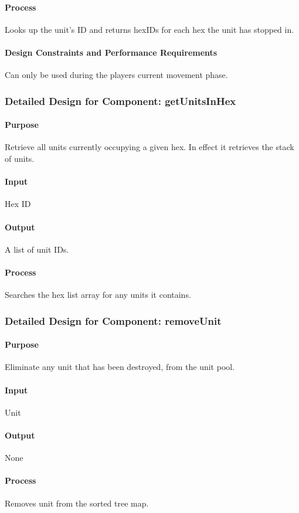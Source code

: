\documentclass[12pt,a4paper,titlepage]{article}
\begin{document}
\paragraph{Process} Looks up the unit's ID and returns hexIDs for each hex the unit has stopped in.
\paragraph{Design Constraints and Performance Requirements} Can only be used during the players current movement phase.

\subsubsection{Detailed Design for Component: getUnitsInHex}
\paragraph{Purpose} Retrieve all units currently occupying a given hex.  In effect it retrieves the stack of units.
\paragraph{Input} Hex ID
\paragraph{Output} A list of unit IDs.
\paragraph{Process} Searches the hex list array for any units it contains.

\subsubsection{Detailed Design for Component: removeUnit}
\paragraph{Purpose} Eliminate any unit that has been destroyed, from the unit pool.
\paragraph{Input} Unit
\paragraph{Output} None
\paragraph{Process} Removes unit from the sorted tree map.
\end{document}
